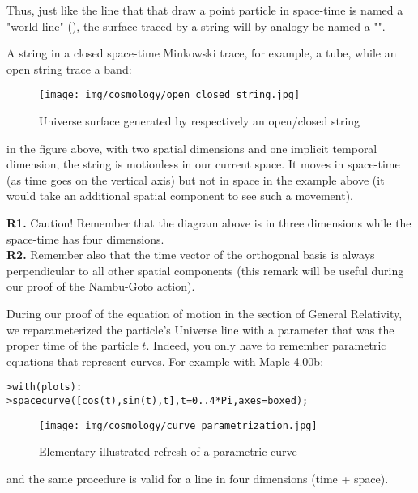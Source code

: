 	Thus, just like the line that that draw a point particle in space-time is named a "world line" (), the surface traced by a string will by analogy be named a "".
	
	A string in a closed space-time Minkowski trace, for example, a tube, while an open string trace a band:
	\begin{figure}[H]
		\begin{center}
		\texttt{[image: img/cosmology/open\_closed\_string.jpg]}
		\end{center}	
		\caption{Universe surface generated by respectively an open/closed string}
	\end{figure}
	in the figure above, with two spatial dimensions and one implicit temporal dimension, the string is motionless in our current space. It moves in space-time (as time goes on the vertical axis) but not in space in the example above (it would take an additional spatial component to see such a movement).
	\begin{tcolorbox}[title=Remark,colframe=black,arc=10pt]
	\textbf{R1.} Caution! Remember that the diagram above is in three dimensions while the space-time has four dimensions.\\
	
	\textbf{R2.} Remember also that the time vector of the orthogonal basis is always perpendicular to all other spatial components (this remark will be useful during our proof of the Nambu-Goto action).
	\end{tcolorbox}
	
	During our proof of the equation of motion in the section of General Relativity, we reparameterized the particle's Universe line with a parameter that was the proper time of the particle $t$. Indeed, you only have to remember parametric equations that represent curves. For example with Maple 4.00b:
	
	\texttt{>with(plots):}\\
	\texttt{>spacecurve([cos(t),sin(t),t],t=0..4*Pi,axes=boxed);}
	
	\begin{figure}[H]
		\begin{center}
		\texttt{[image: img/cosmology/curve\_parametrization.jpg]}
		\end{center}	
		\caption{Elementary illustrated refresh of a parametric curve}
	\end{figure}
	and the same procedure is valid for a line in four dimensions (time + space).
	
